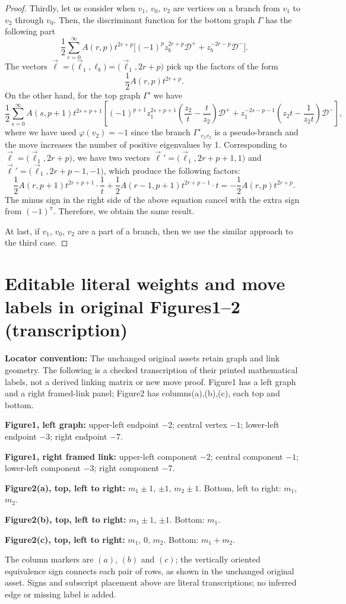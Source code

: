 \documentclass[11pt]{article}
\numberwithin{equation}{section}
\numberwithin{equation}{section}
\begin{document}
\begin{proof}
	Thirdly, let us consider when $ v_1$, $v_0$, $v_2 $ are vertices on a branch from $ v_1 $ to $ v_2 $ through $ v_0 $. Then, the discriminant function for the bottom graph $ \Gamma $ has the following part
	\[
	\frac{1}{2}\sum_{r=0}^{\infty} A(r,p)t^{2r+p} \big[(-1)^p z_b^{2r+p}\mathcal{D}^{+}+z_b^{-2r-p}\mathcal{D}^{-}\big].
	\]
	The vectors $ \vec{\ell}=\big(\vec{\ell}_1,\ell_b\big)=\big(\vec{\ell}_1,2r+p\big) $ pick up the factors of the form
	\[
	\frac{1}{2}A(r,p)t^{2r+p}.
	\]
	On the other hand, for the top graph $ \Gamma' $ we have
	\[
	\frac{1}{2}\sum_{s=0}^{\infty}A(s,p+1)t^{2s+p+1}\left[(-1)^{p+1}z_1^{2s+p+1}\left(\frac{z_2}{t}-\frac{t}{z_2}\right)\mathcal{D}^{+}+z_1^{-2s-p-1}\left(z_2t-\frac{1}{z_2t}\right)\mathcal{D}^{-}\right],
	\]
	where we have used $ \varphi(v_2)=-1 $ since the branch $ \Gamma'_{v_1 v_2} $ is a pseudo-branch and the move increases the number of positive eigenvalues by 1. Corresponding to $ \vec{\ell}=\big(\vec{\ell}_1,2r+p\big) $, we have two vectors $ \vec{\ell}'=\big(\vec{\ell}_1,2r+p+1,1\big) $ and $ \vec{\ell}'=\big(\vec{\ell}_1,2r+p-1,-1\big) $, which produce the following factors:
	\[
	\frac{1}{2}A(r,p+1)t^{2r+p+1}\cdot\frac{1}{t}+\frac{1}{2}A(r-1,p+1)t^{2r+p-1}\cdot t=-\frac{1}{2}A(r,p)t^{2r+p}.
	\]
	The minus sign in the right side of the above equation cancel with the extra sign from $ (-1)^{\pi} $. Therefore, we obtain the same result.
	
	At last, if $ v_1$, $v_0$, $v_2 $ are a part of a branch, then we use the similar approach to the third case.
\end{proof}
\section*{Editable literal weights and move labels in original Figures1--2 (transcription)}
\noindent\textbf{Locator convention:} The unchanged original assets retain graph and link geometry. The following is a checked transcription of their printed mathematical labels, not a derived linking matrix or new move proof. Figure1 has a left graph and a right framed-link panel; Figure2 has columns(a),(b),(c), each top and bottom.
\par\medskip
\noindent\textbf{Figure1, left graph:} upper-left endpoint $-2$; central vertex $-1$; lower-left endpoint $-3$; right endpoint $-7$.
\par\noindent\textbf{Figure1, right framed link:} upper-left component $-2$; central component $-1$; lower-left component $-3$; right component $-7$.
\par\medskip
\noindent\textbf{Figure2(a), top, left to right:} $m_1\pm1$, $\pm1$, $m_2\pm1$. Bottom, left to right: $m_1$, $m_2$.
\par\noindent\textbf{Figure2(b), top, left to right:} $m_1\pm1$, $\pm1$. Bottom: $m_1$.
\par\noindent\textbf{Figure2(c), top, left to right:} $m_1$, $0$, $m_2$. Bottom: $m_1+m_2$.
\par\noindent The column markers are $(a)$, $(b)$ and $(c)$; the vertically oriented equivalence sign  connects each pair of rows, as shown in the unchanged original asset. Signs and subscript placement above are literal transcriptions; no inferred edge or missing label is added.
\end{document}

